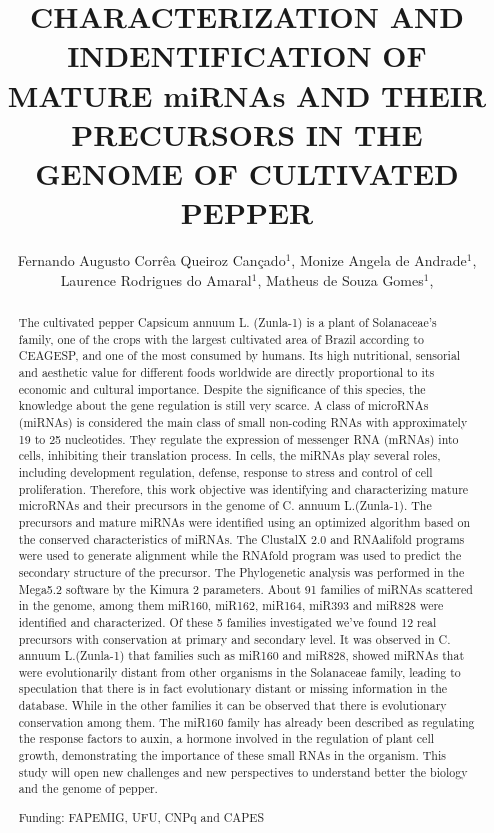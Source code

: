 \documentclass[twoside]{article}
\title{\vspace{-15mm}\fontsize{24pt}{10pt}\selectfont\textbf{ CHARACTERIZATION AND INDENTIFICATION OF MATURE miRNAs AND THEIR PRECURSORS IN THE GENOME OF CULTIVATED PEPPER }} %
\author{ Fernando Augusto Corrêa Queiroz Cançado$^{1}$, Monize Angela de Andrade$^{1}$, Laurence Rodrigues do Amaral$^{1}$, Matheus de Souza Gomes$^{1}$, }
\affil{ 1 UFU

 }
\date{}
\begin{document}
  
  
  \maketitle %
  
  
  \thispagestyle{fancy} %
  
  
  \begin{abstract}
  The cultivated pepper Capsicum annuum L. (Zunla-1) is a plant of Solanaceae's family, one of the crops with the largest cultivated area of Brazil according to CEAGESP, and one of the most consumed by humans. Its high nutritional, sensorial and aesthetic value for different foods worldwide are directly proportional to its economic and cultural importance. Despite the significance of this species, the knowledge about the gene regulation is still very scarce. A class of microRNAs (miRNAs) is considered the main class of small non-coding RNAs with approximately 19 to 25 nucleotides. They regulate the expression of messenger RNA (mRNAs) into cells, inhibiting their translation process. In cells, the miRNAs play several roles, including development regulation, defense, response to stress and control of cell proliferation. Therefore, this work objective was identifying and characterizing mature microRNAs and their precursors in the genome of C. annuum L.(Zunla-1). The precursors and mature miRNAs were identified using an optimized algorithm based on the conserved characteristics of miRNAs. The ClustalX 2.0 and RNAalifold programs were used to generate alignment while the RNAfold program was used to predict the secondary structure of the precursor. The Phylogenetic analysis was performed in the Mega5.2 software by the Kimura 2 parameters. About 91 families of miRNAs scattered in the genome, among them miR160, miR162, miR164, miR393 and miR828 were identified and characterized. Of these 5 families investigated we've found 12 real precursors with conservation at primary and secondary level. It was observed in C. annuum L.(Zunla-1) that families such as miR160 and miR828, showed miRNAs that were evolutionarily distant from other organisms in the Solanaceae family, leading to speculation that there is in fact evolutionary distant or missing information in the database. While in the other families it can be observed that there is evolutionary conservation among them. The miR160 family has already been described as regulating the response factors to auxin, a hormone involved in the regulation of plant cell growth, demonstrating the importance of these small RNAs in the organism. This study will open new challenges and new perspectives to understand better the biology and the genome of pepper.
  
  Funding: FAPEMIG, UFU, CNPq and CAPES \\ 
  \end{abstract}
  
\end{document}
